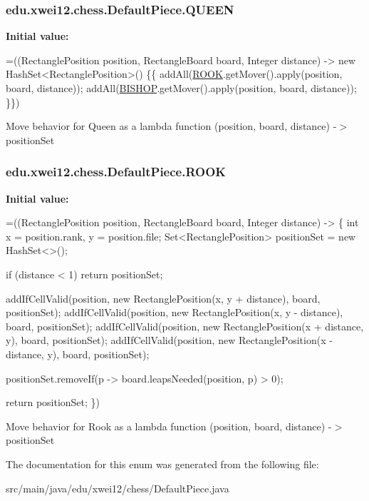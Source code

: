\subsubsection[{\texorpdfstring{Q\+U\+E\+EN}{QUEEN}}]{\setlength{\rightskip}{0pt plus 5cm}edu.\+xwei12.\+chess.\+Default\+Piece.\+Q\+U\+E\+EN}\hypertarget{enumedu_1_1xwei12_1_1chess_1_1_default_piece_a921844f485161196a36ec332630085d9}{}\label{enumedu_1_1xwei12_1_1chess_1_1_default_piece_a921844f485161196a36ec332630085d9}
{\bfseries Initial value\+:}
\begin{DoxyCode}
=((RectanglePosition position, RectangleBoard board, Integer distance) -> \textcolor{keyword}{new} HashSet<RectanglePosition>() 
      \{\{
        addAll(\hyperlink{enumedu_1_1xwei12_1_1chess_1_1_default_piece_af1515056ef8ca028d9ffa78928bd210d}{ROOK}.getMover().apply(position, board, distance));
        addAll(\hyperlink{enumedu_1_1xwei12_1_1chess_1_1_default_piece_aef91d35be3261782e80df06a566be2f6}{BISHOP}.getMover().apply(position, board, distance));
    \}\})
\end{DoxyCode}
Move behavior for Queen as a lambda function (position, board, distance) -\/$>$ position\+Set 
\subsubsection[{\texorpdfstring{R\+O\+OK}{ROOK}}]{\setlength{\rightskip}{0pt plus 5cm}edu.\+xwei12.\+chess.\+Default\+Piece.\+R\+O\+OK}\hypertarget{enumedu_1_1xwei12_1_1chess_1_1_default_piece_af1515056ef8ca028d9ffa78928bd210d}{}\label{enumedu_1_1xwei12_1_1chess_1_1_default_piece_af1515056ef8ca028d9ffa78928bd210d}
{\bfseries Initial value\+:}
\begin{DoxyCode}
=((RectanglePosition position, RectangleBoard board, Integer distance) -> \{
        \textcolor{keywordtype}{int} x = position.rank, y = position.file;
        Set<RectanglePosition> positionSet = \textcolor{keyword}{new} HashSet<>();

        
        \textcolor{keywordflow}{if} (distance < 1) \textcolor{keywordflow}{return} positionSet;

        
        addIfCellValid(position, \textcolor{keyword}{new} RectanglePosition(x, y + distance), board, positionSet);
        addIfCellValid(position, \textcolor{keyword}{new} RectanglePosition(x, y - distance), board, positionSet);
        addIfCellValid(position, \textcolor{keyword}{new} RectanglePosition(x + distance, y), board, positionSet);
        addIfCellValid(position, \textcolor{keyword}{new} RectanglePosition(x - distance, y), board, positionSet);

        
        positionSet.removeIf(p -> board.leapsNeeded(position, p) > 0);

        \textcolor{keywordflow}{return} positionSet;
    \})
\end{DoxyCode}
Move behavior for Rook as a lambda function (position, board, distance) -\/$>$ position\+Set 

The documentation for this enum was generated from the following file\+:\begin{DoxyCompactItemize}
\item 
src/main/java/edu/xwei12/chess/Default\+Piece.\+java\end{DoxyCompactItemize}
